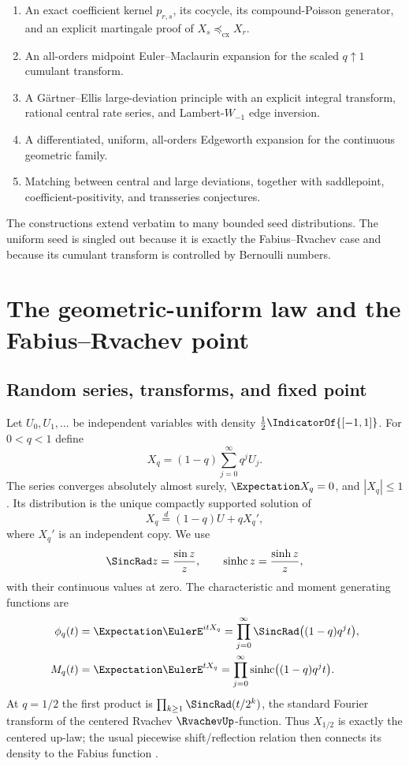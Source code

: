 \documentclass[11pt,a4paper]{article}
\theoremstyle{definition}
\newcommand{\sinhc}{\operatorname{sinhc}}
\begin{document}
\begin{enumerate}[label=\textbf{R\arabic*.}]
\item An exact coefficient kernel $p_{r,s}$, its cocycle, its
compound-Poisson generator, and an explicit martingale proof of
$X_s\preceq_{\mathrm{cx}}X_r$.
\item An all-orders midpoint Euler--Maclaurin expansion for the scaled
$q\uparrow1$ cumulant transform.
\item A G\"artner--Ellis large-deviation principle with an explicit integral
transform, rational central rate series, and Lambert-$W_{-1}$ edge inversion.
\item A differentiated, uniform, all-orders Edgeworth expansion for the
continuous geometric family.
\item Matching between central and large deviations, together with
saddlepoint, coefficient-positivity, and transseries conjectures.
\end{enumerate}

The constructions extend verbatim to many bounded seed distributions.  The
uniform seed is singled out because it is exactly the Fabius--Rvachev case
and because its cumulant transform is controlled by Bernoulli numbers.

\section{The geometric-uniform law and the Fabius--Rvachev point}
\label{sec:setup}

\subsection{Random series, transforms, and fixed point}

Let $U_0,U_1,\dots$ be independent variables with density
$\frac12\IndicatorOf{[-1,1]}$.  For $0<q<1$ define
\begin{equation}
  X_q=(1-q)\sum_{j=0}^{\infty}q^jU_j.
  \label{eq:Xq}
\end{equation}
The series converges absolutely almost surely, $\Expectation X_q=0$, and
$|X_q|\le1$.  Its distribution is the unique compactly supported solution of
\begin{equation}
  X_q\overset{d}= (1-q)U+qX_q',
  \label{eq:perpetuity}
\end{equation}
where $X_q'$ is an independent copy.  We use
\[
 \SincRad z=\frac{\sin z}{z},\qquad
 \sinhc z=\frac{\sinh z}{z},
\]
with their continuous values at zero.  The characteristic and moment
generating functions are
\begin{align}
 \phi_q(t)&=\Expectation \EulerE^{itX_q}
   =\prod_{j=0}^{\infty}\SincRad\bigl((1-q)q^jt\bigr),
   \label{eq:cf}\\
 M_q(t)&=\Expectation \EulerE^{tX_q}
   =\prod_{j=0}^{\infty}\sinhc\bigl((1-q)q^jt\bigr).
   \label{eq:mgf}
\end{align}
At $q=1/2$ the first product is
$\prod_{k\ge1}\SincRad(t/2^k)$, the standard Fourier transform of the centered
Rvachev $\RvachevUp$-function.  Thus $X_{1/2}$ is exactly the centered up-law; the
usual piecewise shift/reflection relation then connects its density to the
Fabius function \cite{Fabius1966,Rvachev1990,Arias2018}.
\end{document}
